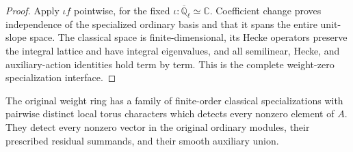 \begin{proof}
Apply \(\iota f\) pointwise, for the fixed
\(\iota:\overline{\mathbb Q}_\ell\simeq\mathbb C\).
Coefficient change proves independence of the specialized ordinary
basis and that it spans the entire unit-slope space.  The classical
space is finite-dimensional, its Hecke operators preserve the
integral lattice and have integral eigenvalues, and all semilinear,
Hecke, and auxiliary-action identities hold term by term.  This is
the complete weight-zero specialization interface.
\end{proof}

\begin{proposition}
\label{prop:selmer-good-zero}
The original weight ring has a family of finite-order classical
specializations with pairwise distinct local torus characters which
detects every nonzero element of \(A\).  They detect every nonzero
vector in the original ordinary modules, their prescribed residual
summands, and their smooth auxiliary union.
\end{proposition}

